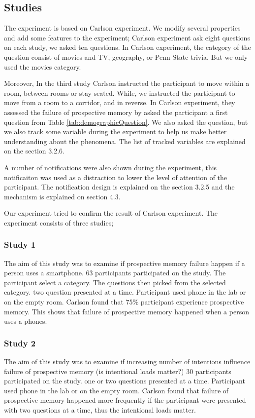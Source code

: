 \subsection{Studies}
The experiment is based on Carlson experiment. We modify several properties and add some features to the experiment;
Carlson experiment ask eight questions on each study, we asked ten questions.
In Carlson experiment, the category of the question consist of movies and TV,
geography, or Penn State trivia. But we only used the movies category.

Moreover, In the third study Carlson instructed the participant to move within a room, between rooms or stay seated.
While, we instructed the participant to move from a room to a corridor, and in reverse.
In Carlson experiment, they assessed the failure of prospective memory by asked the participant a first question
from Table \ref{tab:demographicQuestion}. We also asked the question, but we also track some variable during the experiment to help us make better
understanding about the phenomena. The list of tracked variables are explained on the section 3.2.6.

A number of notifications were also shown during the experiment, this notificaiton was used as a distraction to lower the level of attention
of the participant. The notification design is explained on the section 3.2.5 and the mechanism
is explained on section 4.3.

Our experiment tried to confirm the result of Carlson experiment. The experiment consists of three studies;

\subsubsection{Study 1}
The aim of this study was to examine if prospective memory failure happen if a person uses a smartphone.
63 participants participated on the study.
The participant select a category.
 The questions then picked from the selected category.
two question presented at a time. Participant used phone in the lab or on the empty room.
Carlson found that 75\% participant experience prospective memory.
This shows that failure of prospective memory happened when a person uses a phones.

\subsubsection{Study 2}
The aim of this study was to examine if increasing number of intentions influence failure of prospective memory (is intentional loads matter?)
30 participants participated on the study.
one or two questions presented at a time.
Participant used phone in the lab or on the empty room.
Carlson found that failure of prospective memory happened more frequently if the participant were
presented with two questions at a time, thus the intentional loads matter.

